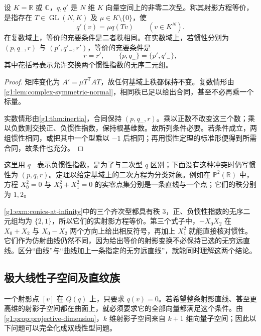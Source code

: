 \begin{theorem}
	\label{g1:thm:projective-quadric-classification}
	设 \(K=\mathbb R\) 或 \(\mathbb C\)，\(q,q'\) 是 \(N\) 维 \(K\) 向量空间上的非零二次型。称其射影方程等价，是指存在 \(T\in\operatorname{GL}(N,K)\) 及 \(\mu\in K\setminus\{0\}\)，使
	\[
		q'(v)=\mu q(Tv)\qquad(v\in K^N).
	\]
	在复数域上，等价的充要条件是二者秩相同。在实数域上，若惯性分别为 \((p,q_-,r)\) 与 \((p',q'_-,r')\)，等价的充要条件是
	\[
		r=r',\qquad \{p,q_-\}=\{p',q'_-\},
	\]
	其中花括号表示允许交换两个惯性指数的无序二元组。
\end{theorem}

\begin{proof}
	矩阵变化为 \(A' =\mu T^{\mathsf T}AT\)，故任何基域上秩都保持不变。复数情形由\cref{g1:lem:complex-symmetric-normal}，相同秩已足以给出合同，甚至不必再乘一个标量。

	实数情形由\cref{g1:thm:inertia}，合同保持 \((p,q_-,r)\)。乘以正数不改变这三个数；乘以负数则交换正、负惯性指数，保持根基维数。故所列条件必要。若条件成立，两组惯性相同，或把其中一个型乘以 \(-1\) 后相同；再用惯性定理的标准形便得到所需合同，故条件也充分。
\end{proof}

这里用 \(q_-\) 表示负惯性指数，是为了与二次型 \(q\) 区别；下面没有这种冲突时仍写惯性为 \((p,q,r)\)。定理以给定基域上的二次方程为分类对象。例如在 \(\mathbb P^2(\mathbb R)\) 中，方程 \(X_0^2=0\) 与 \(X_0^2+X_1^2=0\) 的实零点集分别是一条直线与一个点；它们的秩分别为 \(1,2\)。

\begin{example}
	\label{g1:exm:one-projective-conic-type}
	\cref{g1:exm:conics-at-infinity}中的三个齐次型都具有秩 \(3\)，正、负惯性指数的无序二元组均为 \(\{2,1\}\)，所以它们的实射影方程等价。第三个式子中，\(-X_0X_2\) 在 \(X_0+X_2\) 与 \(X_0-X_2\) 两个方向上给出相反符号，再加上 \(X_1^2\) 就能直接核对惯性。它们作为仿射曲线仍然不同，因为给出等价的射影变换不必保持已选的无穷远直线。区分“曲线”与“曲线加上一条指定的无穷远直线”，就能同时理解这两个结论。
\end{example}

\subsection{极大线性子空间及直纹族}
\label{g1:subsec:0203:03}

一个射影点 \([v]\) 在 \(Q(q)\) 上，只要求 \(q(v)=0\)。若希望整条射影直线、甚至更高维的射影子空间都在曲面上，就必须要求它的全部向量都满足这个条件。由\cref{g1:prop:projective-dimension}，\(k\) 维射影子空间来自 \(k+1\) 维向量子空间；因此以下问题可以完全化成双线性型问题。

